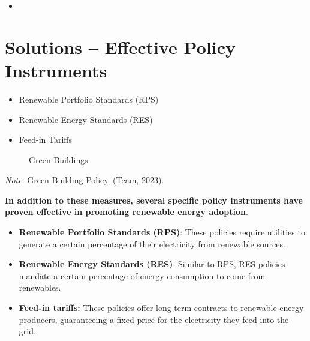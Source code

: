 \documentclass[
  letterpaper,
  DIV=11,
  numbers=noendperiod]{scrartcl}
\providecommand{\tightlist}{%
  \setlength{\itemsep}{0pt}\setlength{\parskip}{0pt}}\usepackage{longtable,booktabs,array}
\begin{document}
\begin{itemize}
\tightlist
\item
\end{itemize}

\section{Solutions -- Effective Policy
Instruments}\label{solutions-effective-policy-instruments}

\begin{itemize}
\tightlist
\item
  Renewable Portfolio Standards (RPS)
\item
  Renewable Energy Standards (RES)
\item
  Feed-in Tariffs
\end{itemize}

\begin{figure}


\caption{\label{fig-solutions}Green Buildings}

\end{figure}%

\emph{Note}. Green Building Policy. (Team, 2023).

\textbf{In addition to these measures, several specific policy
instruments have proven effective in promoting renewable energy
adoption}.

\begin{itemize}
\tightlist
\item
  \textbf{Renewable Portfolio Standards (RPS)}: These policies require
  utilities to generate a certain percentage of their electricity from
  renewable sources.
\item
  \textbf{Renewable Energy Standards (RES)}: Similar to RPS, RES
  policies mandate a certain percentage of energy consumption to come
  from renewables.
\item
  \textbf{Feed-in tariffs:} These policies offer long-term contracts to
  renewable energy producers, guaranteeing a fixed price for the
  electricity they feed into the grid.
\end{itemize}
\end{document}
